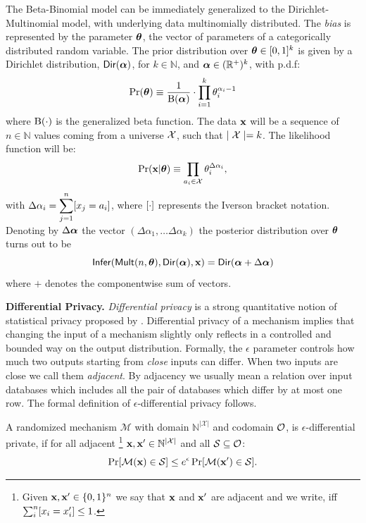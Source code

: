 \documentclass{article}
\begin{document}
The Beta-Binomial model can be immediately generalized to the Dirichlet-Multinomial model, with underlying data multinomially distributed.
The \emph{bias} is represented by the parameter $\boldsymbol{\theta}$, the vector of parameters of a categorically distributed random variable. The prior distribution over $\boldsymbol{\theta}\in [0,1]^{k}$
is given by a Dirichlet distribution, $\mathsf{Dir}(\boldsymbol{\alpha})$, for $k\in\mathbb{N}$,
and $\boldsymbol{\alpha}\in(\mathbb{R}^{+})^{k}$, with p.d.f:
\[
\Pr(\boldsymbol{\theta})\equiv\frac{1}{\boldsymbol{\textup{B}}(\boldsymbol{\alpha})}\cdot\prod_{i=1}^{k}{\theta_i^{\alpha_i-1}}
\]
where $\boldsymbol{\textup{B}}(\cdot)$ is the generalized beta function.
The data $\textbf{x}$ will be a sequence of $n\in\mathbb{N}$ values
coming from a universe $\mathcal{X}$, such that $\mid\mathcal{X} \mid=k$.
The likelihood function will be:
\[
\Pr(\textbf{x}|\boldsymbol{\theta})\equiv\prod_{a_i\in\mathcal{X}}\theta_{i}^{\Delta \alpha_i},
\]
with $\Delta \alpha_i=\displaystyle\sum_{j=1}^{n}[x_j=a_i]$, where $[\cdot]$ represents the Iverson bracket notation.
Denoting by $\Delta\boldsymbol{\alpha}$ the vector $(\Delta\alpha_1,\dots \Delta\alpha_k)$ the posterior distribution over $\boldsymbol{\theta}$ turns out to be
\[
   \mathsf{Infer}(\mathsf{Mult}(n, \boldsymbol{\theta}), \mathsf{Dir}(\boldsymbol{\alpha}), \textbf{x})=\mathsf{Dir}(\boldsymbol{\alpha} + \Delta \boldsymbol{\alpha}) 
\]
where $+$ denotes the componentwise sum of vectors.


\noindent \textbf{Differential Privacy.}
\emph{Differential privacy} is a strong quantitative notion of statistical privacy proposed by \cite{dwork2006}.
Differential privacy of a mechanism implies that changing the input of a mechanism slightly only reflects
in a controlled and bounded way on the output distribution. 
Formally, the $\epsilon$ parameter
controls how much two outputs starting from \emph{close} inputs can differ. When two inputs are close we call them \emph{adjacent}.
By adjacency we usually mean a relation over input databases which includes all the pair of databases which differ by at most one row.
The formal definition of $\epsilon$-differential privacy follows.
\begin{definition}
\label{def_epsilon_dp}

A randomized mechanism $\mathcal{M}$ with domain $\mathbb{N}^{|\mathcal{X}|}$ and codomain $\mathcal{O}$, is $\epsilon$-differential private, if for all adjacent
\footnote{Given $\textbf{x}, \textbf{x}'\in\{0,1\}^n$  we say that $\textbf{x}$ and $\textbf{x}'$ are adjacent and we write, iff
$\sum_{i}^{n}[x_i = x'_i ]\leq 1$. } $\textbf{x}, \textbf{x}' \in \mathbb{N}^{|\mathcal{X}|}$ and all $\mathcal{S} \subseteq \mathcal{O}$:
\begin{equation*}
\Pr[\mathcal{M}(\textbf{x}) \in \mathcal{S}] \leq e^\epsilon \Pr[\mathcal{M}(\textbf{x}') \in \mathcal{S}].
\end{equation*}

\end{definition}
\end{document}
